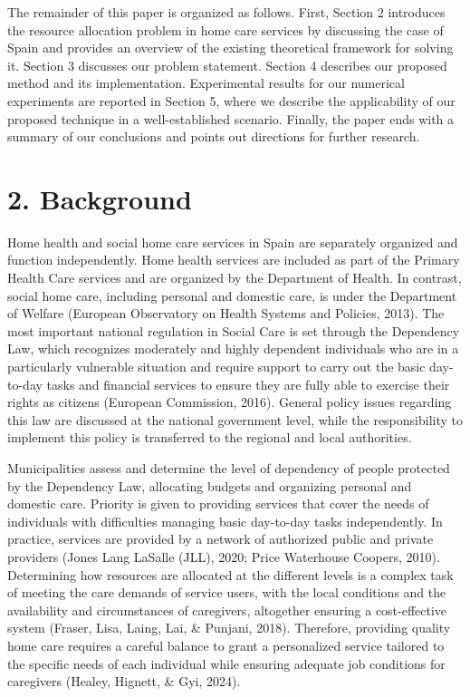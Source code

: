 \documentclass[10pt]{article}
\begin{document}
The remainder of this paper is organized as follows. First, Section 2 introduces the resource allocation problem in home care services by discussing the case of Spain and provides an overview of the existing theoretical framework for solving it. Section 3 discusses our problem statement. Section 4 describes our proposed method and its implementation. Experimental results for our numerical experiments are reported in Section 5, where we describe the applicability of our proposed technique in a well-established scenario. Finally, the paper ends with a summary of our conclusions and points out directions for further research.

\section*{2. Background}
Home health and social home care services in Spain are separately organized and function independently. Home health services are included as part of the Primary Health Care services and are organized by the Department of Health. In contrast, social home care, including personal and domestic care, is under the Department of Welfare (European Observatory on Health Systems and Policies, 2013). The most important national regulation in Social Care is set through the Dependency Law, which recognizes moderately and highly dependent individuals who are in a particularly vulnerable situation and require support to carry out the basic day-to-day tasks and financial services to ensure they are fully able to exercise their rights as citizens (European Commission, 2016). General policy issues regarding this law are discussed at the national government level, while the responsibility to implement this policy is transferred to the regional and local authorities.

Municipalities assess and determine the level of dependency of people protected by the Dependency Law, allocating budgets and organizing personal and domestic care. Priority is given to providing services that cover the needs of individuals with difficulties managing basic day-to-day tasks independently. In practice, services are provided by a network of authorized public and private providers (Jones Lang LaSalle (JLL), 2020; Price Waterhouse Coopers, 2010). Determining how resources are allocated at the different levels is a complex task of meeting the care demands of service users, with the local conditions and the availability and circumstances of caregivers, altogether ensuring a cost-effective system (Fraser, Lisa, Laing, Lai, \& Punjani, 2018). Therefore, providing quality home care requires a careful balance to grant a personalized service tailored to the specific needs of each individual while ensuring adequate job conditions for caregivers (Healey, Hignett, \& Gyi, 2024).
\end{document}
